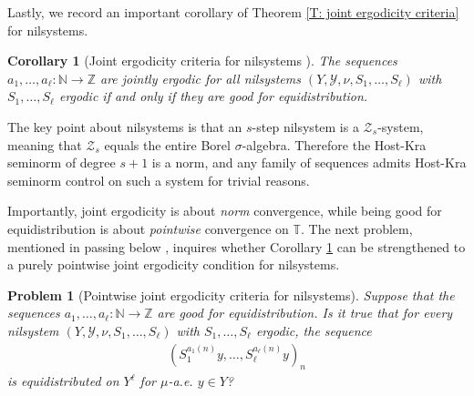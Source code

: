 \documentclass[11pt]{amsart}
\newtheorem{corollary}[lemma]{Corollary}
\newtheorem{problem}{Problem}
\theoremstyle{definition}
\newcommand{\N}{{\mathbb N}}
\newcommand{\T}{{\mathbb T}}
\newcommand{\Z}{{\mathbb Z}}
\newcommand{\CX}{{\mathcal X}}
\newcommand{\CY}{{\mathcal Y}}
\newcommand{\CZ}{{\mathcal Z}}
\newcommand{\1}{{\mathbf{1}}}
\begin{document}
Lastly, we record an important corollary of Theorem \ref{T: joint ergodicity criteria} for nilsystems.
\begin{corollary}[Joint ergodicity criteria for nilsystems {\cite[Corollary 1.4]{Fr21}}]\label{C: joint ergodicity criteria for nilsystems}
The sequences $a_1,\ldots,a_\ell\colon \N\to \Z$ are jointly ergodic for all nilsystems $(Y, \CY, \nu, S_1, \ldots, S_\ell)$ with $S_1, \ldots, S_\ell$ ergodic if and only if they are good for equidistribution.

\end{corollary}
    The key point about nilsystems is that an $s$-step nilsystem is a $\CZ_s$-system, meaning that $\CZ_s$ equals the entire Borel $\sigma$-algebra. Therefore the Host-Kra seminorm of degree $s+1$ is a norm, and  any family of sequences admits Host-Kra seminorm control on such a system for trivial reasons.

Importantly, joint ergodicity is about \emph{norm} convergence, while being good for equidistribution is about \emph{pointwise} convergence on $\T$. The next problem, mentioned in passing below \cite[Corollary 1.4]{Fr21}, inquires whether Corollary \ref{C: joint ergodicity criteria for nilsystems} can be strengthened to a purely pointwise joint ergodicity condition for nilsystems.
\begin{problem}[Pointwise joint ergodicity criteria for nilsystems]
    Suppose that the sequences $a_1,\ldots,a_\ell\colon \N\to \Z$ are good for equidistribution. 
    Is it true that for every nilsystem $(Y, \CY, \nu, S_1, \ldots, S_\ell)$ with $S_1, \ldots, S_\ell$
    ergodic, the sequence 
    \begin{align*}
        (S_1^{a_1(n)}y, \ldots, S_\ell^{a_\ell(n)}y)_n
    \end{align*}
    is equidistributed on $Y^\ell$ for $\mu$-a.e. $y\in Y$?
\end{problem}
\end{document}
